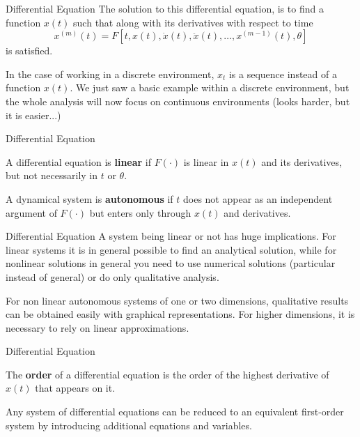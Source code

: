 \documentclass[aspectratio=169]{beamer}
\begin{document}
\begin{frame}{Differential Equation}
    The solution to this differential equation, is to find a function $x(t)$ such that along with its derivatives with respect to time \[x^{(m)}(t)=F[t,x(t),\dot{x}(t),\ddot{x}(t),\ldots,x^{(m-1)}(t),\theta]\] is satisfied.
    
    \vspace{0.5cm}
    
    In the case of working in a discrete environment, $x_t$ is a sequence instead of a function $x(t)$. We just saw a basic example within a discrete environment, but the whole analysis will now focus on continuous environments (looks harder, but it is easier...)
\end{frame}

\begin{frame}{Differential Equation}
    \begin{definition}
        A differential equation is \textbf{linear} if $F(\cdot)$ is linear in $x(t)$ and its derivatives, but not necessarily in $t$ or $\theta$.
    \end{definition}
    \begin{definition}
        A dynamical system is \textbf{autonomous} if $t$ does not appear as an independent argument of $F(\cdot)$ but enters only through $x(t)$ and derivatives.
    \end{definition}
\end{frame}

\begin{frame}{Differential Equation}
    A system being linear or not has huge implications. For linear systems it is in general possible to find an analytical solution, while for nonlinear solutions in general you need to use numerical solutions (particular instead of general) or do only qualitative analysis.
    
    \vspace{0.5cm}
    
    For non linear autonomous systems of one or two dimensions, qualitative results can be obtained easily with graphical representations. For higher dimensions, it is necessary to rely on linear approximations.
    
\end{frame}

\begin{frame}{Differential Equation}
    \begin{definition}
    The \textbf{order} of a differential equation is the order of the highest derivative of $x(t)$ that appears on it.
    \end{definition}
    \begin{fact}
        Any system of differential equations can be reduced to an equivalent first-order system by introducing additional equations and variables.
    \end{fact}
\end{frame}
\end{document}
